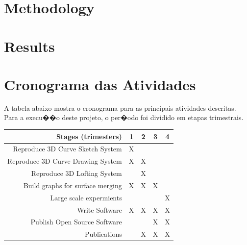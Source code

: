 \documentclass[a4paper,titlepage]{article}
\begin{document}
\section{Methodology}

\section{Results}

\section{Cronograma das Atividades}
A tabela abaixo mostra o cronograma para as principais atividades descritas. Para a
execu��o deste projeto, o per�odo foi dividido em etapas trimestrais.
\begin{center}
\begin{tabular} {||r|c|c|c|c||}
\hline
\textbf{Stages (trimesters)} & 1 & 2 & 3 & 4 \\
\hline
Reproduce 3D Curve Sketch System& X &  & & \\
\hline
Reproduce 3D Curve Drawing System& X & X & & \\
\hline
Reproduce 3D Lofting System &   & X &  & \\
\hline
Build graphs for surface merging& X & X & X & \\
\hline
Large scale expermients&   &   & & X\\
\hline
Write Software & X & X & X & X\\
\hline
Publish Open Source Software &  &  & X & X \\
\hline
Publications &  & X & X& X\\
\hline
\end{tabular}
\end{center}


\nocite{Fabbri:2002}


%
%
\end{document}
